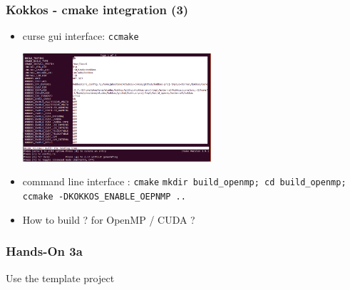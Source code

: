 \begin{frame}[fragile=singleslide]
  \frametitle{Kokkos - cmake integration (3)}

  \begin{itemize}
  \item curse gui interface: \texttt{ccmake}
    \begin{center}
      \includegraphics[width=7cm]{images/ccmake_kokkos}
    \end{center}
  \item command line interface : \texttt{cmake}
    \texttt{mkdir build\_openmp; cd build\_openmp; ccmake -DKOKKOS\_ENABLE\_OEPNMP ..}
  \item How to build ? for OpenMP / CUDA ?
  \end{itemize}

\end{frame}
  
\begin{frame}[fragile=singleslide]
  \frametitle{Hands-On 3a}

  Use the template project

\end{frame}

